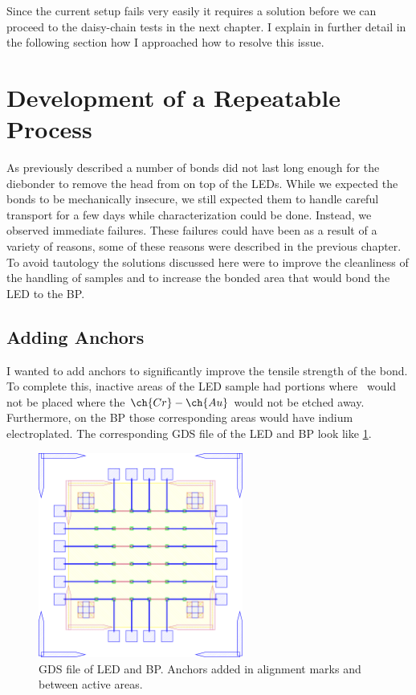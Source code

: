 Since the current setup fails very easily it requires a solution before we can proceed to the daisy-chain tests in the next chapter.
I explain in further detail in the following section how I approached how to resolve this issue.


\section{Development of a Repeatable Process}
\label{sec:Ch2_repeatable}

As previously described a number of bonds did not last long enough for the diebonder to remove the head from on top of the LEDs. While we expected the bonds to be mechanically insecure, we still expected them to handle careful transport for a few days while characterization could be done. Instead, we observed immediate failures. These failures could have been as a result of a variety of reasons, some of these reasons were described in the previous chapter. To avoid tautology the solutions discussed here were to improve the cleanliness of the handling of samples and to increase the bonded area that would bond the LED to the BP.

\subsection{Adding Anchors}

I wanted to add anchors to significantly improve the tensile strength of the bond. To complete this, inactive areas of the LED sample had portions where \uleds \ would not be placed where the $\ch{Cr}-\ch{Au}$ would not be etched away. Furthermore, on the BP those corresponding areas would have indium electroplated. The corresponding GDS file of the LED and BP look like \ref{fig:gds_bp_led_anchors}.



\begin{figure}
    \centering
    \includegraphics[width=0.6\textwidth]{Main/Ch2/DC_DieBTest_V5.GDStex_output.pdf}
    \caption{GDS file of LED and BP. Anchors added in alignment marks and between active areas. }
    \label{fig:gds_bp_led_anchors}
\end{figure}


